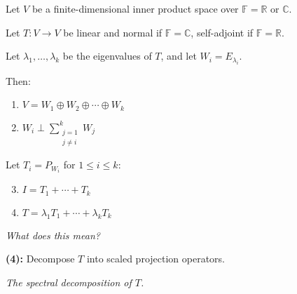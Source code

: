 \documentclass{article}
\begin{document}
\begin{theorem}
    Let \( V \) be a finite-dimensional inner product space over \( \mathbb{F} = \mathbb{R} \) or \( \mathbb{C} \).

    Let \( T: V \to V \) be linear and normal if \( \mathbb{F} = \mathbb{C} \), self-adjoint if \( \mathbb{F} = \mathbb{R} \).
    
    Let \( \lambda_1, \ldots, \lambda_k \) be the eigenvalues of \( T \), and let \( W_i = E_{\lambda_i} \).
    
    Then:
    
    \begin{enumerate}
        \item \( V = W_1 \oplus W_2 \oplus \cdots \oplus W_k \)
        \item \( W_i \perp \sum_{\substack{j = 1 \\ j \neq i}}^{k} W_j \)
    \end{enumerate}
    
    Let \( T_i = P_{W_i} \) for \( 1 \leq i \leq k \):
    
    \begin{enumerate}
        \setcounter{enumi}{2}
        \item \( I = T_1 + \cdots + T_k \)
        \item \( T = \lambda_1 T_1 + \cdots + \lambda_k T_k \)
    \end{enumerate}
    
    \textit{What does this mean?}
    
    \textbf{(4):} Decompose \( T \) into scaled projection operators.
    
    \textit{The spectral decomposition of \( T \).}
\end{theorem}
\end{document}
